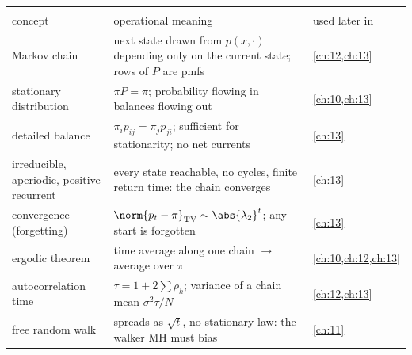 \begin{center}
\small
\renewcommand{\arraystretch}{1.15}
\begin{tabularx}{\linewidth}{@{}>{\raggedright\arraybackslash}p{3.3cm}
                               >{\raggedright\arraybackslash}X
                               >{\raggedright\arraybackslash}p{2.3cm}@{}}
\toprule
\multicolumn{3}{@{}l}{\textbf{Markov chains}}\\
concept & operational meaning & used later in\\\midrule
Markov chain & next state drawn from $p(x,\cdot)$ depending only on the current state; rows of $P$ are pmfs & \cref{ch:12,ch:13}\\
stationary distribution & $\pi P=\pi$; probability flowing in balances flowing out & \cref{ch:10,ch:13}\\
detailed balance & $\pi_ip_{ij}=\pi_jp_{ji}$; sufficient for stationarity; no net currents & \cref{ch:13}\\
irreducible, aperiodic, positive recurrent & every state reachable, no cycles, finite return time: the chain converges & \cref{ch:13}\\
convergence (forgetting) & $\norm{p_t-\pi}_{\rm TV}\sim\abs{\lambda_2}^t$; any start is forgotten & \cref{ch:13}\\
ergodic theorem & time average along one chain $\to$ average over $\pi$ & \cref{ch:10,ch:12,ch:13}\\
autocorrelation time & $\tau=1+2\sum\rho_k$; variance of a chain mean $\sigma^2\tau/N$ & \cref{ch:12,ch:13}\\
free random walk & spreads as $\sqrt t$, no stationary law: the walker MH must bias & \cref{ch:11}\\
\bottomrule
\end{tabularx}
\end{center}

